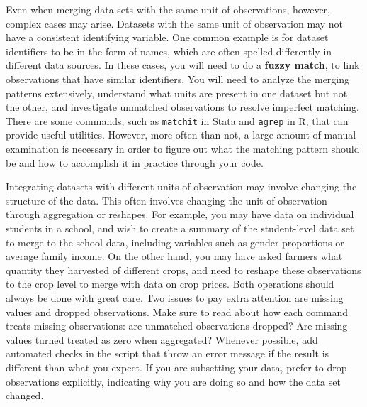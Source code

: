 Even when merging data sets with the same unit of observations, however,
complex cases may arise.
Datasets with the same unit of observation may not have a consistent identifying variable.
One common example is for dataset identifiers to be in the form of names, 
which are often spelled differently in different data sources. 
In these cases, you will need to do a \textbf{fuzzy match}, 
to link observations that have similar identifiers. 
You will need to analyze the merging patterns extensively,
understand what units are present in one dataset but not the other,
and investigate unmatched observations to resolve imperfect matching.
There are some commands, such as \texttt{matchit} in Stata
and \texttt{agrep} in R,
that can provide useful utilities.
However, more often than not, a large amount of manual examination is necessary
in order to figure out what the matching pattern should be
and how to accomplish it in practice through your code.

Integrating datasets with different units of observation may involve changing the structure of the data.
This often involves changing the unit of observation through aggregation or reshapes.
For example, you may have data on individual students in a school,
and wish to create a summary of the student-level data set to merge to the school data, 
including variables such as gender proportions or average family income.
On the other hand, you may have asked farmers what quantity they harvested of different crops,
and need to reshape these observations to the crop level to merge with data on crop prices.
Both operations should always be done with great care. 
Two issues to pay extra attention are missing values and dropped observations.
Make sure to read about how each command treats missing observations:
are unmatched observations dropped? Are missing values turned treated as zero when aggregated?
Whenever possible, add automated checks in the script that throw an error message 
if the result is different than what you expect.
If you are subsetting your data, prefer to drop observations explicitly,
indicating why you are doing so and how the data set changed.

